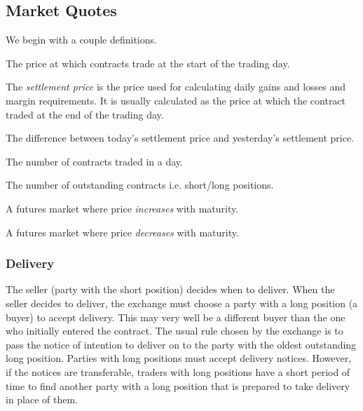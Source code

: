 \subsection{Market Quotes}
\bigskip

\begin{definition*}
    We begin with a couple definitions.
    \begin{definition}\label{def:open}
        The price at which contracts trade at the start of the trading day.
    \end{definition}
    \begin{definition}\label{def:settle}
        The \emph{settlement price} is the price used for calculating daily gains and losses and margin requirements. It is usually calculated as the price at which the contract traded at the end of the trading day.
    \end{definition}
    \begin{definition}[Change]\label{def:change}
        The difference between today's settlement price and yesterday's settlement price.
    \end{definition}
    \begin{definition}\label{def:vol}
        The number of contracts traded in a day.
    \end{definition}
    \begin{definition}\label{def:open2}
        The number of outstanding contracts i.e. short/long positions.
    \end{definition}
    \begin{definition}\label{def:normal}
        A futures market where price \emph{increases} with maturity.
    \end{definition}
    \begin{definition}\label{def:invert}
        A futures market where price \emph{decreases} with maturity.
    \end{definition}
\end{definition*} 

\subsubsection*{Delivery}

The seller (party with the short position) decides when to deliver. When the seller decides to deliver, the exchange must choose a party with a long position (a buyer) to accept delivery. This may very well be a different buyer than the one who initially entered the contract. The usual rule chosen by the exchange is to pass the notice of intention to deliver on to the party with the oldest outstanding long position. Parties with long positions must accept delivery notices. However, if the notices are transferable, traders with long positions have a short period of time to find another party with a long position that is prepared to take delivery in place of them.

